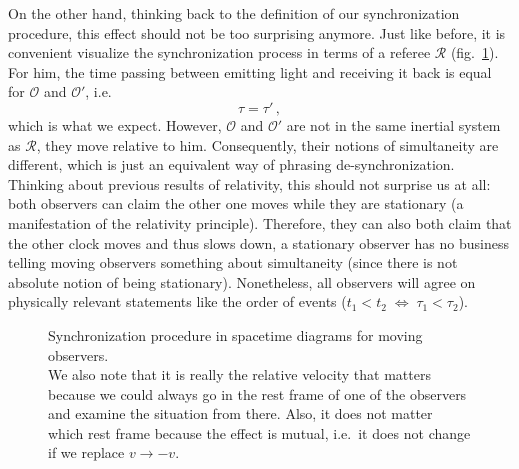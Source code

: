 On the other hand, thinking back to the definition of our synchronization procedure, this effect should not be too surprising anymore. Just like before, it is convenient visualize the synchronization process in terms of a referee $\mathcal{R}$ (fig.~\ref{fig:moving_clocks}). For him, the time passing between emitting light and receiving it back is equal for $\mathcal{O}$ and $\mathcal{O}'$, i.e.
\begin{equation}
	\tau = \tau' \, ,
\end{equation}
which is what we expect. However, $\mathcal{O}$ and $\mathcal{O}'$ are not in the same inertial system as $\mathcal{R}$, they move relative to him. Consequently, their notions of simultaneity are different, which is just an equivalent way of phrasing de-synchronization. Thinking about previous results of relativity, this should not surprise us at all: both observers can claim the other one moves while they are stationary (a manifestation of the relativity principle). Therefore, they can also both claim that the other clock moves and thus slows down, a stationary observer has no business telling moving observers something about simultaneity (since there is not absolute notion of being stationary). Nonetheless, all observers will agree on physically relevant statements like the order of events ($t_1 < t_2 \; \Leftrightarrow \; \tau_1 < \tau_2$).



\begin{figure}
	\centering
	
	\subfloat[Observers moving with relative velocity $v = 0.6 c$]{
		
	}\hspace*{0.2\textwidth}
	\subfloat[Observers moving with relative velocity $v = 0.5 c$]{
		
	}
	
	\caption[Synchronization procedure in spacetime diagrams for moving observers]{Synchronization procedure in spacetime diagrams for moving observers.\protect\footnotemark\\
	We also note that it is really the relative velocity that matters because we could always go in the rest frame of one of the observers and examine the situation from there. Also, it does not matter which rest frame because the effect is mutual, i.e.~it does not change if we replace $v \rightarrow -v$.}
	\label{fig:moving_clocks}
\end{figure}

